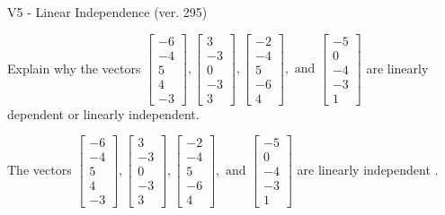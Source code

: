 \begin{exercise}
  \begin{exerciseTitle}V5 - Linear Independence (ver. 295)\end{exerciseTitle}
  \begin{exerciseStatement}
    Explain why the vectors \(\left[\begin{array}{r}
-6 \\
-4 \\
5 \\
4 \\
-3
\end{array}\right] , \left[\begin{array}{r}
3 \\
-3 \\
0 \\
-3 \\
3
\end{array}\right] , \left[\begin{array}{r}
-2 \\
-4 \\
5 \\
-6 \\
4
\end{array}\right] , \text{ and } \left[\begin{array}{r}
-5 \\
0 \\
-4 \\
-3 \\
1
\end{array}\right]\) are linearly dependent or linearly independent.	


  \end{exerciseStatement}
  \begin{exerciseAnswer}
   The vectors \(\left[\begin{array}{r}
-6 \\
-4 \\
5 \\
4 \\
-3
\end{array}\right] , \left[\begin{array}{r}
3 \\
-3 \\
0 \\
-3 \\
3
\end{array}\right] , \left[\begin{array}{r}
-2 \\
-4 \\
5 \\
-6 \\
4
\end{array}\right] , \text{ and } \left[\begin{array}{r}
-5 \\
0 \\
-4 \\
-3 \\
1
\end{array}\right]\) are 
  	 linearly independent  .
  


  \end{exerciseAnswer}
\end{exercise}
